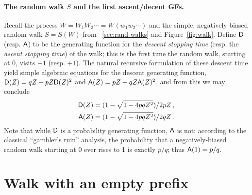   \paragraph{The random walk $S$ and the first ascent/decent GFs.}
  Recall the process $W = W_1 W_2 \cdots = W(w_1 w_2 \cdots)$ 
  and the simple, negatively biased random walk $S = S(W)$ 
  from \Section~\ref{sec:rand-walks} and Figure~\ref{fig:walk}.
  Define $\mathsf{D}$ (resp. $\mathsf{A}$) to be
  the generating function for the \emph{descent stopping time} 
  (resp. the \emph{ascent stopping time}) 
  of the walk; this is the first time the random walk, starting at 0, visits
  $-1$ (resp. $+1$). 
  The natural recursive formulation of these descent time yield 
  simple algebraic equations for the descent generating function,
  $\mathsf{D}(Z) = qZ + pZ \mathsf{D}(Z)^2$ and $\mathsf{A}(Z) = pZ + qZ \mathsf{A}(Z)^2$, 
  and from this we may conclude
  \begin{align*}
    \mathsf{D}(Z) &= (1 - \sqrt{1 - 4pqZ^2})/2pZ\,, \\
    \mathsf{A}(Z) &= (1 - \sqrt{1 - 4pqZ^2})/2qZ\,.
  \end{align*}
  Note that while $\mathsf{D}$ is a probability generating function, 
  $\mathsf{A}$ is not: according to the classical
  ``gambler's ruin'' analysis,
  the probability
  that a negatively-biased random walk starting at 0 ever rises to 1
  is exactly $p/q$; thus $\mathsf{A}(1) = p/q$.






\section{Walk with an empty prefix}\label{sec:catalan-estimates}





